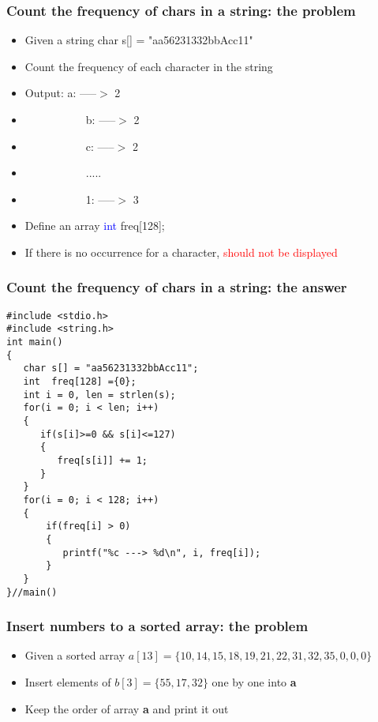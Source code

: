 \begin{frame}
\frametitle{Count the frequency of chars in a string: the problem}
\begin{itemize}
	\item {Given a string char s[] = "aa56231332bbAcc11"}
	\item {Count the frequency of each character in the string}
	\item {Output: a: -----$>$ 2}
	\item {~~~~~~~~~~~b: -----$>$ 2}
	\item {~~~~~~~~~~~c: -----$>$ 2}
	\item {~~~~~~~~~~~.....}
	\item {~~~~~~~~~~~1: -----$>$ 3}
\end{itemize}
\begin{itemize}
	\item {Define an array \textcolor{blue}{int} freq[128];}
	\item {If there is no occurrence for a character, \textcolor{red}{should not be displayed}}
\end{itemize}
\end{frame}


\ifx\answer\undefined

\begin{frame}[fragile]
\frametitle{Count the frequency of chars in a string: the answer}
\vspace{-0.2in}
\begin{lstlisting}[xleftmargin=0.05\linewidth, linewidth=0.90\linewidth]
#include <stdio.h>
#include <string.h>
int main()
{
   char s[] = "aa56231332bbAcc11";
   int  freq[128] ={0};
   int i = 0, len = strlen(s);
   for(i = 0; i < len; i++)
   {
      if(s[i]>=0 && s[i]<=127)
      {
         freq[s[i]] += 1;
      }
   }
   for(i = 0; i < 128; i++)
   {
       if(freq[i] > 0)
       {
          printf("%c ---> %d\n", i, freq[i]);
       }
   }
}//main()
\end{lstlisting}
\end{frame}
\fi

\begin{frame}
\frametitle{Insert numbers to a sorted array: the problem}
\begin{itemize}
	\item {Given a sorted array $a[13]=\{10,14,15,18,19,21,22,31,32,35, 0, 0, 0\}$}
	\item {Insert elements of $b[3]=\{55, 17, 32\}$ one by one into \textbf{a}}
	\item {Keep the order of array \textbf{a} and print it out}
\end{itemize}

\end{frame}

